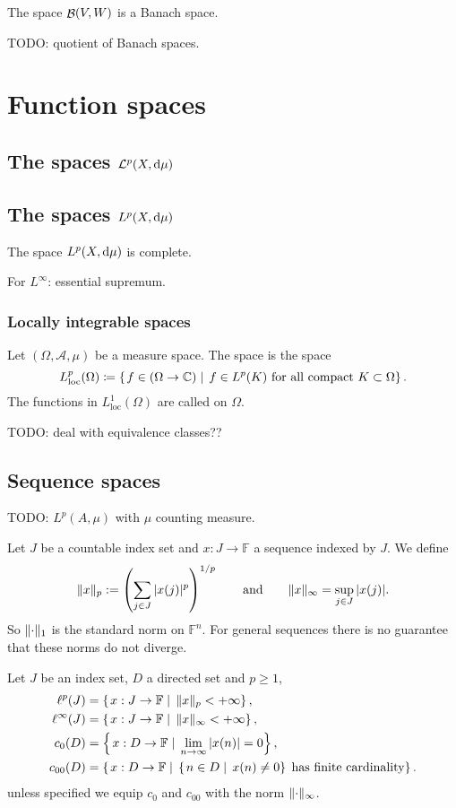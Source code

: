 The space $\mathop{\mathcal{B}}(V,W)$ is a Banach space.

TODO: quotient of Banach spaces.

\section{Function spaces}
\subsection{The spaces $\mathcal{L}^p(X,\operatorname{d \!}{\mu})$}
\subsection{The spaces $L^p(X,\operatorname{d \!}{\mu})$}
\begin{theorem}
The space $L^p(X,\operatorname{d \!}{\mu})$ is complete.
\end{theorem}

For $L^\infty$: essential supremum.

\subsubsection{Locally integrable spaces}
\begin{definition}
Let $(\Omega, \mathcal{A}, \mu)$ be a measure space. The  space is the space
\[ L^p_\text{loc}(\Omega) \coloneqq \left\{\left. f \in (\Omega\to\mathbb{C}) \;\right|\; \text{$f\in L^p(K)$ for all compact $K\subset \Omega$} \right\}. \]
The functions in $L^1_\text{loc}(\Omega)$ are called  on $\Omega$.
\end{definition}
TODO: deal with equivalence classes??

\subsection{Sequence spaces}
TODO:  $L^p(A,\mu)$ with $\mu$ counting measure.

Let $J$ be a countable index set and $x:J\to \mathbb{F}$ a sequence indexed by $J$. We define
\[ \lVert x\rVert_p := \left(\sum_{j\in J}|x(j)|^p\right)^{1/p} \qquad\text{and}\qquad \lVert x\rVert_\infty = \sup_{j\in J}|x(j)|. \]
So $\lVert\cdot\rVert_1$ is the standard norm on $\mathbb{F}^n$. For general sequences there is no guarantee that these norms do not diverge.
\begin{definition}
Let $J$ be an index set, $D$ a directed set and $p\geq 1$,
\begin{align*}
\ell^p(J) &= \left\{\left. x:J\to \mathbb{F} \;\right|\; \lVert x\rVert_p < +\infty \right\},\\
\ell^\infty(J) &= \left\{\left. x:J\to \mathbb{F} \;\right|\; \lVert x\rVert_\infty < +\infty \right\},\\
c_0(D) &= \left\{\left. x:D\to \mathbb{F} \;\right|\; \lim_{n\to\infty}|x(n)| = 0 \right\}, \\
c_{00}(D) &= \left\{\left. x:D\to \mathbb{F} \;\right|\; \left\{\left. n\in D \;\right|\; x(n)\neq 0 \right\}\;\text{has finite cardinality} \right\}.
\end{align*}
unless specified we equip $c_0$ and $c_{00}$ with the norm $\lVert\cdot\rVert_\infty$.
\end{definition}

